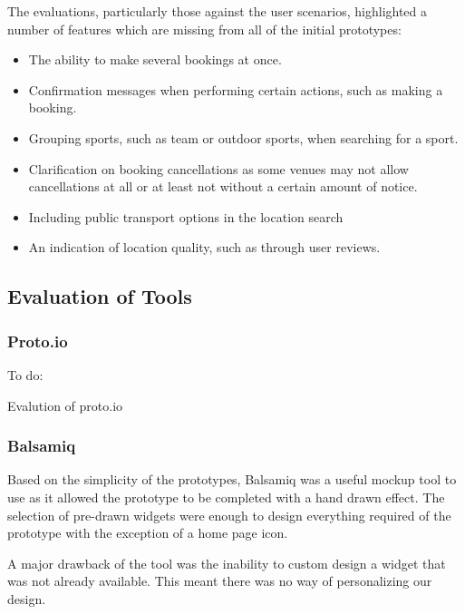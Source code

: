 The evaluations, particularly those against the user scenarios, highlighted a
number of features which are missing from all of the initial prototypes:

\begin{itemize}
	\item The ability to make several bookings at once.
	\item Confirmation messages when performing certain actions, such as making
		a booking.
	\item Grouping sports, such as team or outdoor sports, when searching for a
		sport.
	\item Clarification on booking cancellations as some venues may not allow
		cancellations at all or at least not without a certain amount of
		notice.
	\item Including public transport options in the location search
	\item An indication of location quality, such as through user reviews.
\end{itemize}

\subsection{Evaluation of Tools}

\subsubsection{Proto.io}

To do:

Evalution of proto.io

\subsubsection{Balsamiq}

Based on the simplicity of the prototypes, Balsamiq was a useful mockup tool to
use as it allowed the prototype to be completed with a hand drawn effect. The
selection of pre-drawn widgets were enough to design everything required of the
prototype with the exception of a home page icon.

A major drawback of the tool was the inability to custom design a widget that
was not already available.  This meant there was no way of personalizing our
design.
\restoregeometry%
